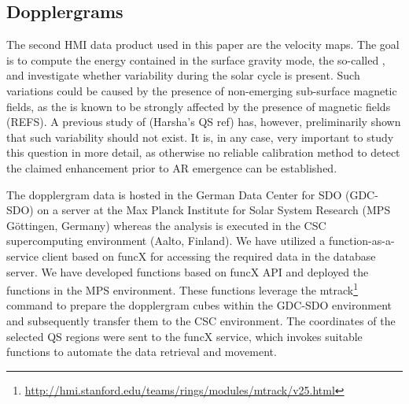 \documentclass{aa}
\begin{document}
\subsection{Dopplergrams}

The second HMI data product used in this paper are the \los{} velocity maps. The goal is to compute the 
energy contained in the
surface gravity mode, the so-called \fff,
and investigate whether variability during the solar cycle is present. Such variations could be caused by the presence of non-emerging sub-surface magnetic fields, as the \fff is known
to be strongly affected by the presence of magnetic fields (REFS). A previous study of
(Harsha's QS ref) has, however,
preliminarily shown that such
variability should not exist. 
It is, in any case, very important to study this question in more detail, as otherwise no reliable calibration method to detect the claimed 
\fff enhancement prior to AR emergence can be established.

The dopplergram data is hosted in the German Data Center for SDO (GDC-SDO) on a server at the Max Planck Institute for Solar System Research (MPS Göttingen, Germany) whereas the analysis is executed in the CSC supercomputing environment (Aalto, Finland). We have utilized  a function-as-a-service client based on funcX \cite[]{chard20funcx} for accessing the required data in the database server. We have developed functions based on funcX API and deployed the functions in the MPS environment. These functions leverage the mtrack\footnote{\url{http://hmi.stanford.edu/teams/rings/modules/mtrack/v25.html}} command to prepare the dopplergram cubes within the GDC-SDO environment and subsequently transfer them to the CSC environment. The coordinates of the selected 
QS
regions were sent to the funcX service, which invokes suitable functions to automate the data retrieval and movement.


%
\end{document}
